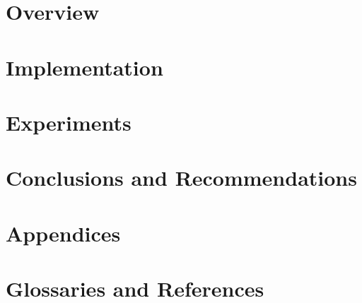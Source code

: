 \documentclass[\mytextsize, a4paper, twoside, openany]{memoir}
\begin{document}
\frontmatter


\mainmatter
\part{Overview}
\label{pt:overview}



\part{Implementation}
\label{pt:implementation}


\part{Experiments}
\label{pt:experiments}

\label{pt:results}


\part{Conclusions and Recommendations}


\part{Appendices}
\label{pt:appendices}


\part{Glossaries and References}
\label{pt:backmatter}
\backmatter

\end{document}
